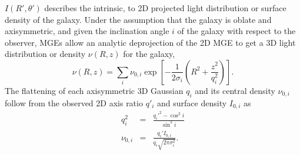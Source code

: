 $I(R',\theta')$ describes the intrinsic, to 2D projected light distribution or surface density of the galaxy. Under the assumption that the galaxy is oblate and axisymmetric, and given the inclination angle $i$ of the galaxy with respect to the observer, MGEs allow an analytic deprojection of the 2D MGE to get a 3D light distribution or density $\nu(R,z)$ for the galaxy,
\begin{equation}
\nu(R,z) = \sum_i \nu_{0,i} \exp \left[-\frac{1}{2\sigma_i}\left(R^2 + \frac{z^2}{q_i^2} \right) \right]. \label{eq:deprojMGE}
\end{equation}
The flattening of each axisymmetric 3D Gaussian $q_i$ and its central density $\nu_{0,i}$ follow from the observed 2D axis ratio $q'_i$ and surface density $I_{0,i}$ as
\begin{eqnarray*}
q_i^2 &=& \frac{q_i'^2 - \cos^2 i}{\sin^2 i}\\
\nu_{0,i} &=& \frac{q_i' I_{0,i}}{q_i \sqrt{2 \pi \sigma_i^2}}.
\end{eqnarray*}


